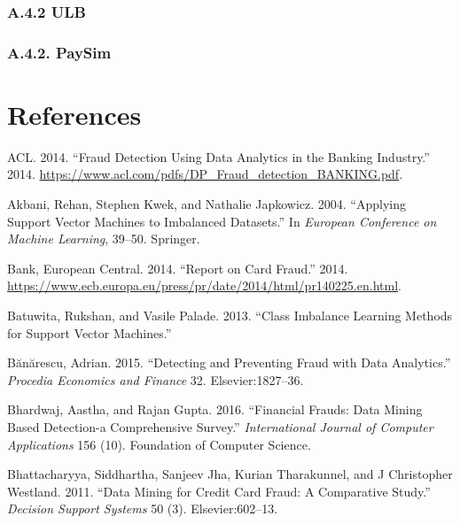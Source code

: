 \documentclass[12pt,]{article}
\begin{document}
\justify

\hypertarget{a.4.2-ulb}{%
\subsubsection{A.4.2 ULB}\label{a.4.2-ulb}}

\hypertarget{a.4.2.-paysim}{%
\subsubsection{A.4.2. PaySim}\label{a.4.2.-paysim}}

\clearpage

\justify

\hypertarget{references}{%
\section*{References}\label{references}}

\hypertarget{refs}{}
\leavevmode\hypertarget{ref-fraudanalyticsacl}{}%
ACL. 2014. ``Fraud Detection Using Data Analytics in the Banking
Industry.'' 2014.
\url{https://www.acl.com/pdfs/DP_Fraud_detection_BANKING.pdf}.

\leavevmode\hypertarget{ref-akbani2004applying}{}%
Akbani, Rehan, Stephen Kwek, and Nathalie Japkowicz. 2004. ``Applying
Support Vector Machines to Imbalanced Datasets.'' In \emph{European
Conference on Machine Learning}, 39--50. Springer.

\leavevmode\hypertarget{ref-ecb_fraud}{}%
Bank, European Central. 2014. ``Report on Card Fraud.'' 2014.
\url{https://www.ecb.europa.eu/press/pr/date/2014/html/pr140225.en.html}.

\leavevmode\hypertarget{ref-batuwita2013class}{}%
Batuwita, Rukshan, and Vasile Palade. 2013. ``Class Imbalance Learning
Methods for Support Vector Machines.''

\leavevmode\hypertarget{ref-buanuarescu2015detecting}{}%
Bănărescu, Adrian. 2015. ``Detecting and Preventing Fraud with Data
Analytics.'' \emph{Procedia Economics and Finance} 32.
Elsevier:1827--36.

\leavevmode\hypertarget{ref-bhardwaj2016financial}{}%
Bhardwaj, Aastha, and Rajan Gupta. 2016. ``Financial Frauds: Data Mining
Based Detection-a Comprehensive Survey.'' \emph{International Journal of
Computer Applications} 156 (10). Foundation of Computer Science.

\leavevmode\hypertarget{ref-bhattacharyya2011data}{}%
Bhattacharyya, Siddhartha, Sanjeev Jha, Kurian Tharakunnel, and J
Christopher Westland. 2011. ``Data Mining for Credit Card Fraud: A
Comparative Study.'' \emph{Decision Support Systems} 50 (3).
Elsevier:602--13.
\end{document}

